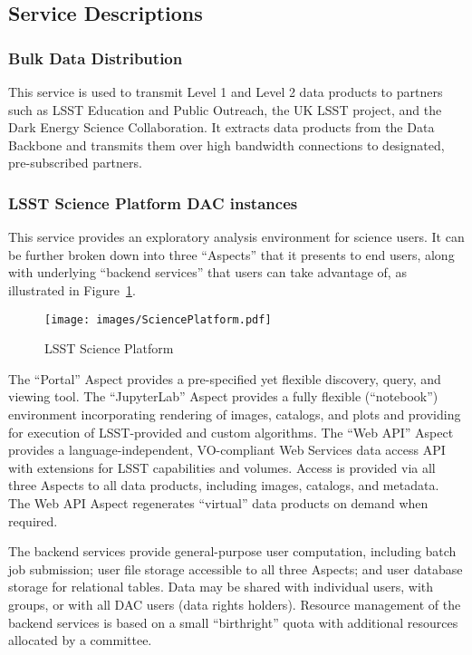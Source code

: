 \documentclass[DM,lsstdraft,toc]{lsstdoc}
\begin{document}
\subsection{Service Descriptions}\label{dac-service-descriptions}

\subsubsection{Bulk Data Distribution}\label{bulk-data-distribution}

This service is used to transmit Level 1 and Level 2 data products to
partners such as LSST Education and Public Outreach, the UK LSST
project, and the Dark Energy Science Collaboration. It extracts data
products from the Data Backbone and transmits them over high bandwidth
connections to designated, pre-subscribed partners.

\subsubsection{LSST Science Platform DAC
instances}\label{lsst-science-platform-dac-instances}

This service provides an exploratory analysis environment for science
users. It can be further broken down into three ``Aspects'' that it
presents to end users, along with underlying ``backend services'' that
users can take advantage of, as illustrated in Figure~\ref{fig:lsp}.

\begin{figure}
\centering
\texttt{[image: images/SciencePlatform.pdf]}
\caption{LSST Science Platform}
\label{fig:lsp}
\end{figure}

The ``Portal'' Aspect provides a pre-specified yet flexible discovery,
query, and viewing tool. The ``JupyterLab'' Aspect provides a fully
flexible (``notebook'') environment incorporating rendering of images,
catalogs, and plots and providing for execution of LSST-provided and
custom algorithms. The ``Web API'' Aspect provides a
language-independent, VO-compliant Web Services data access API with
extensions for LSST capabilities and volumes. Access is provided via all
three Aspects to all data products, including images, catalogs, and
metadata. The Web API Aspect regenerates ``virtual'' data products on
demand when required.

The backend services provide general-purpose user computation, including
batch job submission; user file storage accessible to all three Aspects;
and user database storage for relational tables.  Data may be shared with
individual users, with groups, or with all DAC users (data rights
holders). Resource management of the backend services is based on a
small ``birthright'' quota with additional resources allocated by a
committee.
\end{document}
